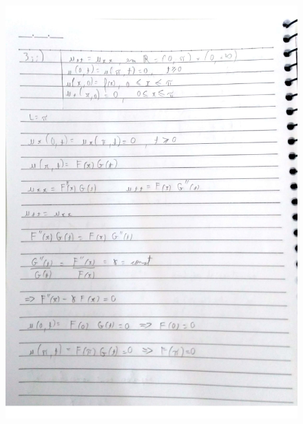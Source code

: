 \documentclass[a4paper]{article}
\begin{document}
        \begin{figure}{\textwidth}
            \centering
            \includegraphics[width=\textwidth]{Questoes-1-3_page-0013.jpg}
        \end{figure}
\end{document}
